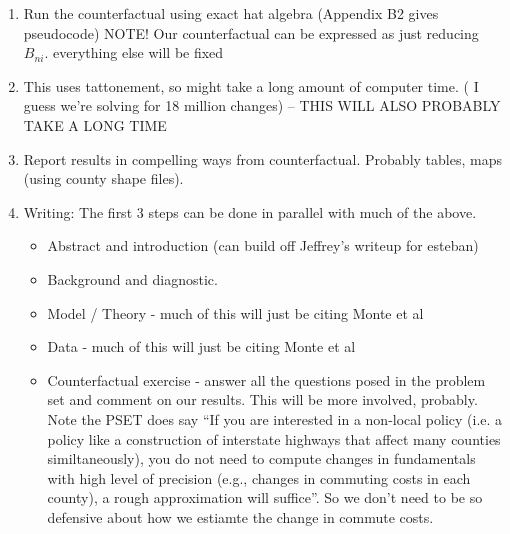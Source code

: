 \documentclass{article}
\begin{document}
\begin{enumerate}
    \item Run the counterfactual using exact hat algebra (Appendix B2 gives pseudocode)  NOTE! Our counterfactual can be expressed as just reducing $B_{ni}$. everything else will be fixed
    \item This uses tattonement, so might take a long amount of computer time. ( I guess we're solving for 18 million changes) -- THIS WILL ALSO PROBABLY TAKE A LONG TIME
    \item  Report results in compelling ways from counterfactual. Probably tables, maps (using county shape files). 
    \item Writing: The first 3 steps can be done in parallel with much of the above.
    \begin{itemize}
        \item Abstract and introduction (can build off Jeffrey's writeup for esteban)
        \item Background and diagnostic.
    \item Model / Theory - much of this will just be citing Monte et al
    \item Data   - much of this will just be citing Monte et al
    \item Counterfactual exercise - answer all the questions posed in the problem set and comment on our results. This will be more involved, probably. Note the PSET does say ``If you are interested in a non-local policy (i.e. a policy like a construction of interstate highways that affect many counties similtaneously), you do not need to compute changes in fundamentals with high level of precision (e.g., changes in commuting costs in each county), a rough approximation will suffice''. So we don't need to be so defensive about how we estiamte the change in commute costs.
    \end{itemize}
\end{enumerate}
\end{document}
